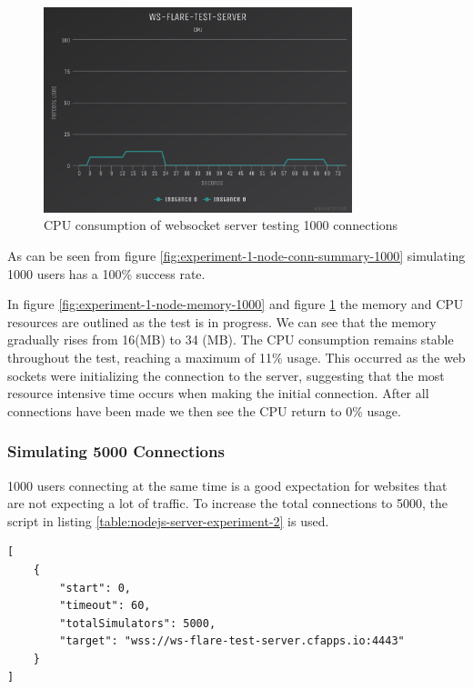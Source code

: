 \begin{figure}[H]
  \centering
    \includegraphics[width=0.8\textwidth]{figures/experiments/experiment-1/node-js/cpu-1000.png}
    \caption{CPU consumption of websocket server testing 1000 connections}
    \label{fig:experiment-1-node-cpu-1000}
\end{figure}

As can be seen from figure \ref{fig:experiment-1-node-conn-summary-1000} simulating 1000 users has a 100\% success rate.

In figure \ref{fig:experiment-1-node-memory-1000} and figure \ref{fig:experiment-1-node-cpu-1000} the memory and CPU resources are outlined as the test is in progress. We can see that the memory gradually rises from 16(MB) to 34 (MB). The CPU consumption remains stable throughout the test, reaching a maximum of 11\% usage. This occurred as the web sockets were initializing the connection to the server, suggesting that the most resource intensive time occurs when making the initial connection. After all connections have been made we then see the CPU return to 0\% usage. 

\subsubsection{Simulating 5000 Connections}

1000 users connecting at the same time is a good expectation for websites that are not expecting a lot of traffic. To increase the total connections to 5000, the script in listing \ref{table:nodejs-server-experiment-2} is used.

\begin{listing}[H]
    \caption{WS-Flare test script for 5000 users}
    \label{table:nodejs-server-experiment-2}
    \begin{verbatim}
[
    {
        "start": 0,
        "timeout": 60,
        "totalSimulators": 5000,
        "target": "wss://ws-flare-test-server.cfapps.io:4443"
    }
]
\end{verbatim}
\end{listing}

